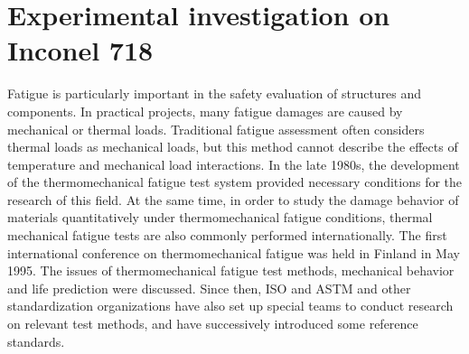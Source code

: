 \chapter{Experimental investigation on Inconel 718}

\noindent
Fatigue is particularly important in the safety evaluation of structures and components. In practical projects, many fatigue damages are caused by mechanical or thermal loads. Traditional fatigue assessment often considers thermal loads as mechanical loads, but this method cannot describe the effects of temperature and mechanical load interactions. In the late 1980s, the development of the thermomechanical fatigue test system provided necessary conditions for the research of this field. At the same time, in order to study the damage behavior of materials quantitatively under thermomechanical fatigue conditions, thermal mechanical fatigue tests are also commonly performed internationally. The first international conference on thermomechanical fatigue was held in Finland in May 1995. The issues of thermomechanical fatigue test methods, mechanical behavior and life prediction were discussed. Since then, ISO and ASTM and other standardization organizations have also set up special teams to conduct research on relevant test methods, and have successively introduced some reference standards.



